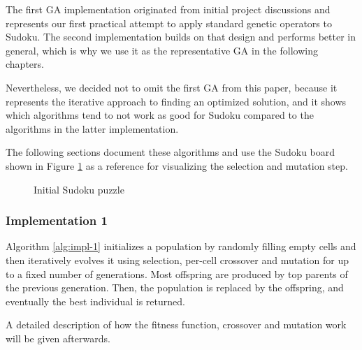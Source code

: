 The first GA implementation originated from initial project discussions and represents our first practical attempt to apply standard genetic operators to Sudoku. The second implementation builds on that design and performs better in general, which is why we use it as the representative GA in the following chapters.

Nevertheless, we decided not to omit the first GA from this paper, because it represents the iterative approach to finding an optimized solution, and it shows which algorithms tend to not work as good for Sudoku compared to the algorithms in the latter implementation.

The following sections document these algorithms and use the Sudoku board shown in Figure \ref{fig:initial-sudoku} as a reference for visualizing the selection and mutation step.

\begin{figure}[H]
\centering
{}
\caption{Initial Sudoku puzzle}
\label{fig:initial-sudoku}
\end{figure}

\subsubsection{Implementation 1}\label{sec:impl-1}
Algorithm \ref{alg:impl-1} initializes a population by randomly filling empty cells and then iteratively evolves it using selection, per-cell crossover and mutation for up to a fixed number of generations.
Most offspring are produced by top parents of the previous generation. Then, the population is replaced by the offspring, and eventually the best individual is returned.

A detailed description of how the fitness function, crossover and mutation work will be given afterwards.

